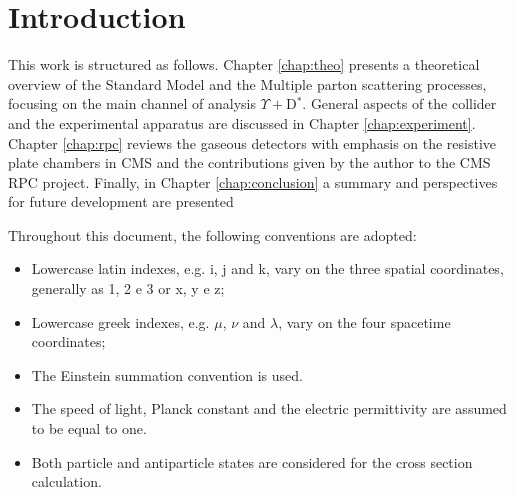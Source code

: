\chapter*{Introduction}

This work is structured as follows. Chapter \ref{chap:theo} presents a theoretical overview of the Standard Model and the Multiple parton scattering processes, focusing on the main channel of analysis $\Upsilon + $D$^*$. General aspects of the collider and the experimental apparatus are discussed in Chapter \ref{chap:experiment}. Chapter \ref{chap:rpc} reviews the gaseous detectors with emphasis on the resistive plate chambers in CMS and the contributions given by the author to the CMS RPC project. Finally, in Chapter \ref{chap:conclusion} a summary and perspectives for future development are presented

Throughout this document, the following conventions are adopted:
\begin{itemize}
    \item Lowercase latin indexes, e.g. i, j and k, vary on the three spatial coordinates, generally as 1, 2 e 3 or x, y e z;
    \item Lowercase greek indexes, e.g. $\mu$, $\nu$ and $\lambda$, vary on the four spacetime coordinates;
    \item The Einstein summation convention is used.
    \item The speed of light, Planck constant and the electric permittivity are assumed to be equal to one.
    \item Both particle and antiparticle states are considered for the cross section calculation.
\end{itemize}